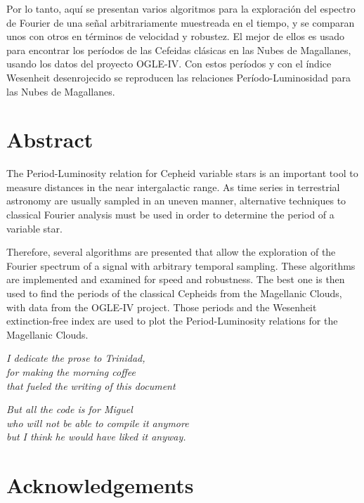 \documentclass[12pt,letterpaper,oneside]{book}
\begin{document}
Por lo tanto, aquí se presentan varios algoritmos para la exploración del espectro de Fourier de una señal arbitrariamente muestreada en el tiempo,
y se comparan unos con otros en términos de velocidad y robustez.
El mejor de ellos es usado para encontrar los períodos de las Cefeidas clásicas en las Nubes de Magallanes, usando los datos del proyecto OGLE-IV.
Con estos períodos y con el índice Wesenheit desenrojecido se reproducen las relaciones Período-Luminosidad para las Nubes de Magallanes.

\chapter*{Abstract}

The Period-Luminosity relation for Cepheid variable stars is an important tool to measure distances in the near intergalactic range. 
As time series in terrestrial astronomy are usually sampled in an uneven manner, 
alternative techniques to classical Fourier analysis must be used in order to determine the period of a variable star.

Therefore, several algorithms are presented that allow the exploration of the Fourier spectrum of a signal with arbitrary temporal sampling.
These algorithms are implemented and examined for speed and robustness. 
The best one is then used to find the periods of the classical Cepheids from the Magellanic Clouds, with data from the OGLE-IV project. 
Those periods and the Wesenheit extinction-free index are used to plot the Period-Luminosity relations for the Magellanic Clouds.


\newpage

\begin{flushright}
	\textit{
		I dedicate the prose to Trinidad,        \\
		for making the morning coffee            \\
		that fueled the writing of this document
	}

	\vspace{5mm}

	\textit{
		But all the code is for Miguel             \\
		who will not be able to compile it anymore \\ 
		but I think he would have liked it anyway.
	}
\end{flushright}

\vspace{2mm}

\chapter*{Acknowledgements}
\end{document}

